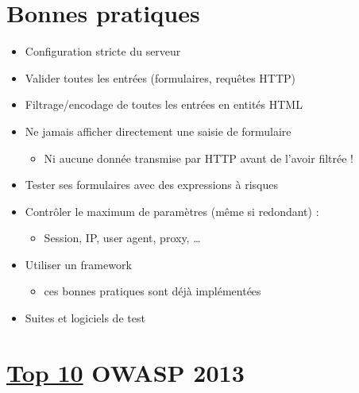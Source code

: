 \hypertarget{bonnes-pratiques}{%
\section{Bonnes pratiques}\label{bonnes-pratiques}}

\begin{itemize}
\tightlist
\item
  Configuration stricte du serveur
\item
  Valider toutes les entrées (formulaires, requêtes HTTP)
\item
  Filtrage/encodage de toutes les entrées en entités HTML
\item
  Ne jamais afficher directement une saisie de formulaire

  \begin{itemize}
  \tightlist
  \item
    Ni aucune donnée transmise par HTTP avant de l'avoir filtrée !
  \end{itemize}
\item
  Tester ses formulaires avec des expressions à risques
\item
  Contrôler le maximum de paramètres (même si redondant) :

  \begin{itemize}
  \tightlist
  \item
    Session, IP, user agent, proxy, \ldots{}
  \end{itemize}
\item
  Utiliser un framework

  \begin{itemize}
  \tightlist
  \item
    ces bonnes pratiques sont déjà implémentées
  \end{itemize}
\item
  Suites et logiciels de test
\end{itemize}

\hypertarget{top-109-owasp-2013}{%
\section{\texorpdfstring{\href{https://www.owasp.org/index.php/Category:OWASP_Top_Ten_Project}{Top
10} OWASP 2013}{Top 10 OWASP 2013}}\label{top-109-owasp-2013}}

